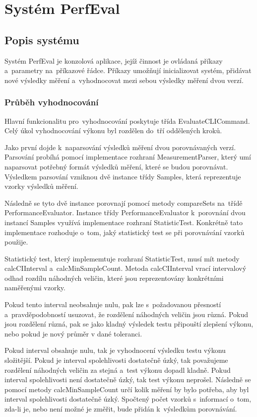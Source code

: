 \chapter{Systém PerfEval}

\section{Popis systému}

Systém PerfEval je konzolová aplikace, jejíž činnost je ovládaná příkazy a~parametry na~příkazové řádce.
Příkazy umožňují inicializovat systém, přidávat nové výsledky měření a~vyhodnocovat mezi sebou výsledky
měření dvou verzí.

\subsection{Průběh vyhodnocování}

Hlavní funkcionalitu pro~vyhodnocování poskytuje třída EvaluateCLICommand. Celý úkol vyhodnocování výkonu
byl rozdělen do~tří oddělených kroků.

Jako první dojde k~naparsování výsledků měření dvou porovnávaných verzí. Parsování probíhá pomocí
implementace rozhraní MeasurementParser, který umí naparsovat potřebný formát výsledků měření, které
se budou porovnávat. Výsledkem parsování vzniknou dvě instance třídy Samples, která reprezentuje vzorky
výsledků měření.

Následně se tyto dvě instance porovnají pomocí metody compareSets na~třídě PerformanceEvaluator. Instance třídy
PerformanceEvaluator k~porovnání dvou instancí Samples využívá implementace rozhraní StatisticTest. Konkrétně
tato implementace rozhoduje o~tom, jaký statistický test se při porovnávání vzorků použije.

Statistický test, který implememtuje rozhraní StatisticTest, musí mít metody calcCIInterval a~calcMinSampleCount.
Metoda calcCIInterval vrací intervalový odhad rozdílu náhodných veličin, které jsou reprezentovány konkrétními
naměřenými vzorky.

Pokud tento interval neobsahuje nulu, pak lze s~požadovanou přesností a~pravděpodobností usuzovat,
že rozdělení náhodných veličin jsou různá. Pokud jsou rozdělení různá, pak se jako kladný výsledek testu připouští
zlepšení výkonu, nebo pokud je nový průměr v dané toleranci.

Pokud interval obsahuje nulu, tak je vyhodnocení výsledku testu výkonu složitější. Pokud je interval spolehlivosti
dostatečně úzký, tak považujeme rozdělení náhodných veličin za stejná a~test výkonu dopadl kladně. Pokud interval
spolehlivosti není dostatečně úzký, tak test výkonu neprošel. Následně se pomocí metody calcMinSampleCount určí
kolik měření by bylo potřeba, aby byl interval spolehlivosti dostatečně úzký. Spočtený počet vzorků s~informací o~tom,
zda-li je, nebo není možné je změřit, bude přidán k~výsledkům porovnávání.

